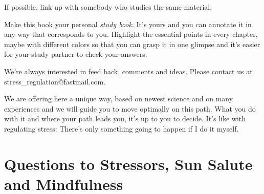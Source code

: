 \documentclass[../main.tex]{subfiles}
\begin{document}
If possible, link up with somebody who studies the same material.

Make this book your personal \emph{study book}. It's yours and you can annotate it in any way that corresponds to you.
Highlight the essential points in every chapter, maybe with different colors so that you can grasp it in one glimpse and it's easier for your study partner to check your answers.


We're always interested in feed back, comments and ideas. Please contact us at stress\_regulation@fastmail.com.


We are offering here a unique way, based on newest science and on many experiences and we will guide you to move optimally on this path.
What you do with it and where your path leads you, it's up to you to decide.
It's like with regulating stress: There's only something going to happen if I do it myself.

\section[Question]{Questions to Stressors, Sun Salute and Mindfulness}
\end{document}
